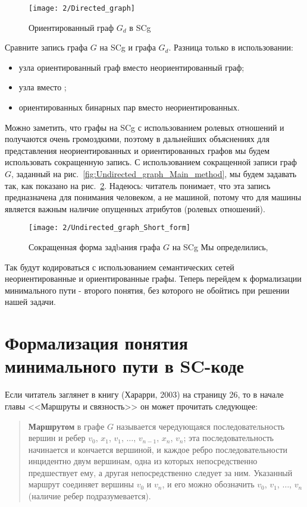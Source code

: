 \begin{figure}[h]
  \centering
  \texttt{[image: 2/Directed\_graph]}
  \caption{Ориентированный граф $G_d$ в SCg}
  \label{fig:Directed_graph}
\end{figure}

Сравните запись графа $G$ на SCg и графа $G_d$. Разница только в
использовании:

\begin{itemize}
\item узла ориентированный граф вместо неориентированный граф;
\item узла  вместо ;
\item ориентированных бинарных пар вместо неориентированных.
\end{itemize}

Можно заметить, что графы на SCg с использованием ролевых отношений
 и  получаются очень громоздкими, поэтому в
дальнейших объяснениях для представления неориентированных и
ориентированных графов мы будем использовать сокращенную запись. С
использованием сокращенной записи граф $G$, заданный на
рис.~\ref{fig:Undirected_graph_Main_method}, мы будем задавать так,
как показано на рис.~\ref{fig:Undirected_graph_Short_form}. Надеюсь:
читатель понимает, что эта запись предназначена для понимания
человеком, а не машиной, потому что для машины является важным наличие
опущенных атрибутов (ролевых отношений).

\begin{figure}[h!]
  \centering
  \texttt{[image: 2/Undirected\_graph\_Short\_form]}
  \caption{Сокращенная форма задbания графа $G$ на SCg Мы определились,}
  \label{fig:Undirected_graph_Short_form}
\end{figure}

Так будут кодироваться с использованием семантических сетей
неориентированные и ориентированные графы. Теперь перейдем к
формализации минимального пути - второго понятия, без которого не
обойтись при решении нашей задачи.

\section{Формализация понятия минимального пути в SC-коде}

Если читатель заглянет в книгу (Харарри, 2003) на страницу 26, то в
начале главы <<Маршруты и связность>> он может прочитать следующее:


\begin{quotation}
  \textbf{Маршрутом} в графе $G$ называется чередующаяся
  последовательность вершин и ребер $v_0$, $x_1$, $v_1$, $\dotsc$,
  $v_{n-1}$, $x_n$, $v_n$; эта последовательность начинается и
  кончается вершиной, и каждое ребро последовательности инцидентно
  двум вершинам, одна из которых непосредственно предшествует ему, а
  другая непосредственно следует за ним. Указанный маршрут соединяет
  вершины $v_0$ и $v_n$, и его можно обозначить $v_0$, $v_1$, $\dotsc$,
  $v_n$ (наличие ребер подразумевается).
\end{quotation}

